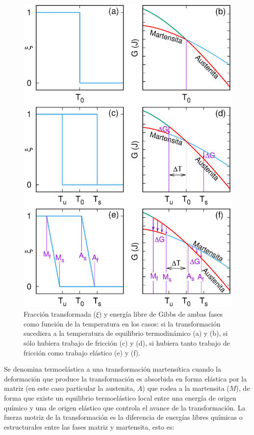 \documentclass[12pt]{article}
\theoremstyle{definition}
\theoremstyle{remark}
\begin{document}
\begin{figure}
	\centering
	\includegraphics[scale=0.7]{img/Termo.eps}
	\caption{Fracción transformada ($\xi$) y energía libre de Gibbs de ambas fases como función de la temperatura en los casos: si la transformación sucediera a la temperatura de equilibrio termodinámico (a) y (b), si sólo hubiera trabajo de fricción (c) y (d), si hubiera tanto trabajo de fricción como trabajo elástico (e) y (f).} 
	\label{Gibbs}
\end{figure}

Se denomina termoelástica a una transformación martensítica cuando la deformación que produce la transformación es absorbida en forma elástica por la matriz (en este caso particular la austenita, $A$) que rodea a la martensita ($M$), de forma que existe un equilibrio termoelástico local entre una energía de origen químico y una de origen elástico que controla el avance de la transformación. La fuerza motriz de la transformación es la diferencia de energías libres químicas o estructurales entre las fases matriz y martensita, esto es:
\end{document}

